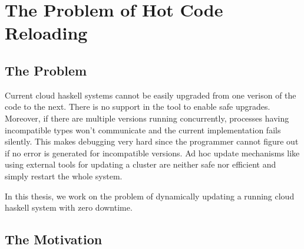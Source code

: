 \section{The Problem of Hot Code Reloading}

\subsection{The Problem}

Current cloud haskell systems cannot be easily upgraded from one
verison of the code to the next. There is no support in the tool to
enable safe upgrades. Moreover, if there are multiple versions running
concurrently, processes having incompatible types won't communicate
and the current implementation fails silently. This makes debugging
very hard since the programmer cannot figure out if no error is
generated for incompatible versions. Ad hoc update mechanisms like
using external tools for updating a cluster are neither safe nor
efficient and simply restart the whole system.

In this thesis, we work on the problem of dynamically updating a
running cloud haskell system with zero downtime.

\subsection{The Motivation}

